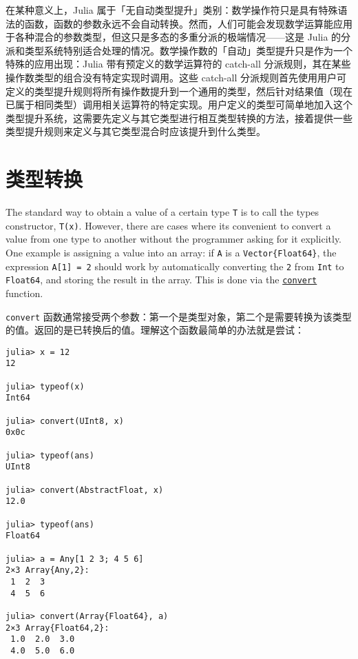 在某种意义上，Julia 属于「无自动类型提升」类别：数学操作符只是具有特殊语法的函数，函数的参数永远不会自动转换。然而，人们可能会发现数学运算能应用于各种混合的参数类型，但这只是多态的多重分派的极端情况——这是 Julia 的分派和类型系统特别适合处理的情况。数学操作数的「自动」类型提升只是作为一个特殊的应用出现：Julia 带有预定义的数学运算符的 catch-all 分派规则，其在某些操作数类型的组合没有特定实现时调用。这些 catch-all 分派规则首先使用用户可定义的类型提升规则将所有操作数提升到一个通用的类型，然后针对结果值（现在已属于相同类型）调用相关运算符的特定实现。用户定义的类型可简单地加入这个类型提升系统，这需要先定义与其它类型进行相互类型转换的方法，接着提供一些类型提升规则来定义与其它类型混合时应该提升到什么类型。



\hypertarget{5183188243565893084}{}


\section{类型转换}



The standard way to obtain a value of a certain type \texttt{T} is to call the type{\textquotesingle}s constructor, \texttt{T(x)}. However, there are cases where it{\textquotesingle}s convenient to convert a value from one type to another without the programmer asking for it explicitly. One example is assigning a value into an array: if \texttt{A} is a \texttt{Vector\{Float64\}}, the expression \texttt{A[1] = 2} should work by automatically converting the \texttt{2} from \texttt{Int} to \texttt{Float64}, and storing the result in the array. This is done via the \hyperlink{1846942650946171605}{\texttt{convert}} function.



\texttt{convert} 函数通常接受两个参数：第一个是类型对象，第二个是需要转换为该类型的值。返回的是已转换后的值。理解这个函数最简单的办法就是尝试：




\begin{verbatim}
julia> x = 12
12

julia> typeof(x)
Int64

julia> convert(UInt8, x)
0x0c

julia> typeof(ans)
UInt8

julia> convert(AbstractFloat, x)
12.0

julia> typeof(ans)
Float64

julia> a = Any[1 2 3; 4 5 6]
2×3 Array{Any,2}:
 1  2  3
 4  5  6

julia> convert(Array{Float64}, a)
2×3 Array{Float64,2}:
 1.0  2.0  3.0
 4.0  5.0  6.0
\end{verbatim}



